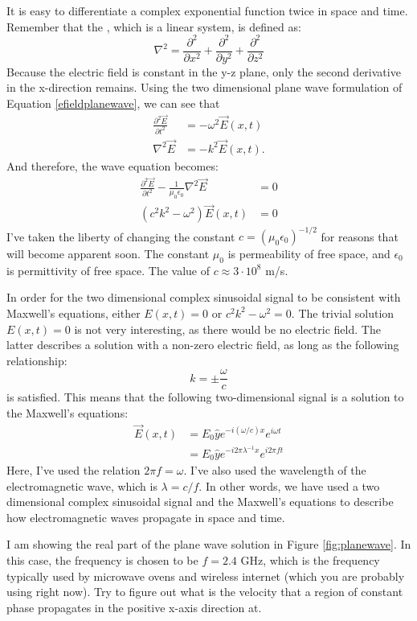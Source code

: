 It is easy to differentiate a complex exponential function twice in space and time. Remember that the , which is a linear system, is defined as:
\begin{equation}
\nabla^2 = \frac{\partial^2}{\partial x^2} + \frac{\partial^2}{\partial y^2} +\frac{\partial^2}{\partial z^2} 
\end{equation}
Because the electric field is constant in the y-z plane, only the second derivative in the x-direction remains. Using the two dimensional plane wave formulation of Equation \ref{efieldplanewave}, we can see that
\begin{align}
\frac{\partial ^2 \vec{E}}{\partial t^2} &= -\omega^2 \vec{E}(x,t) \\
\nabla^2 \vec{E} &= -k^2 \vec{E}(x,t).
\end{align}
And therefore, the wave equation becomes:
\begin{align}
\frac{\partial^2 \vec{E}}{\partial t^2} - \frac{1}{\mu_0 \epsilon_0} \nabla^2 \vec{E} &= 0 \\
(c^2k^2-\omega^2) \vec{E}(x,t) &= 0 \label{eq:disp_relation}
\end{align}
I've taken the liberty of changing the constant $c =
(\mu_0\epsilon_0)^{-1/2}$ for reasons that will become apparent soon. The constant $\mu_0$ is permeability of free space, and $\epsilon_0$ is permittivity of free space. The value of $c \approx 3\cdot 10^{8}$ m/s.

In order for the two dimensional complex sinusoidal signal to be consistent with Maxwell's equations, either $E(x,t)=0$ or $c^2k^2-\omega^2 = 0$. The trivial solution $E(x,t)=0$ is not very interesting, as there would be no electric field. The latter describes a solution with a non-zero electric field, as long as the following relationship:
\begin{equation}
k = \pm \frac{\omega}{c}
\end{equation}
is satisfied. This means that the following two-dimensional signal is a solution to the Maxwell's equations:
\begin{align}
\vec{E}(x,t) &= E_0 \hat{y} e^{-i (\omega/c) x} e^{i\omega t} \\
             &= E_0 \hat{y} e^{-i 2\pi \lambda^{-1} x} e^{i 2\pi f t} 
\end{align}
Here, I've used the relation $2\pi f = \omega$. I've also used the wavelength of the electromagnetic wave, which is $\lambda = c/f$. In other words, we have used a two dimensional complex sinusoidal signal and the Maxwell's equations to describe how electromagnetic waves propagate in space and time.

I am showing the real part of the plane wave solution in
Figure \ref{fig:planewave}. In this case, the frequency is chosen to
be $f=2.4$ GHz, which is the frequency typically used by microwave
ovens and wireless internet (which you are probably using right
now). Try to figure out what is the velocity that a region of constant
phase propagates in the positive x-axis direction at.



